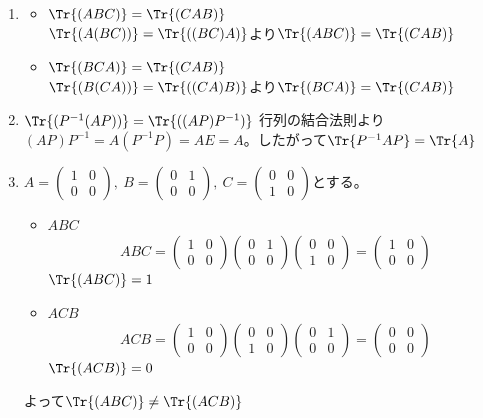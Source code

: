 \begin{souanswer}
\begin{enumerate}
	\item 
\begin{itemize}
	\item $\Tr{(ABC)}= \Tr{(CAB)}$\\
	$\Tr{(A(BC))}= \Tr{((BC)A)}$より$\Tr{(ABC)}= \Tr{(CAB)}$
	\item $\Tr{(BCA)}= \Tr{(CAB)}$\\
	$\Tr{(B(CA))}= \Tr{((CA)B)}$より$\Tr{(BCA)}= \Tr{(CAB)}$
\end{itemize}

	\item $\Tr{(P^{-1}(AP))}= \Tr{((AP)P^{-1})}$
	行列の結合法則より$(AP)P^{-1}= A(P^{-1}P)= AE= A$。したがって$\Tr{P^{-1}AP}= \Tr{A}$

	\item $A= \begin{pmatrix}1& 0\\ 0& 0\end{pmatrix},\ B= \begin{pmatrix}0& 1\\ 0& 0\end{pmatrix},\ C= \begin{pmatrix}0& 0\\ 1& 0\end{pmatrix}$とする。
\begin{itemize}
	\item $ABC$
\begin{equation*}
	ABC= \begin{pmatrix}1& 0\\ 0& 0\end{pmatrix}\begin{pmatrix}0& 1\\ 0& 0\end{pmatrix}\begin{pmatrix}0& 0\\ 1& 0\end{pmatrix}= \begin{pmatrix}1& 0\\ 0& 0\end{pmatrix}
\end{equation*}
	$\Tr{(ABC)}= 1$

	\item $ACB$
\begin{equation*}
	ACB= \begin{pmatrix}1& 0\\ 0& 0\end{pmatrix}\begin{pmatrix}0& 0\\ 1& 0\end{pmatrix}\begin{pmatrix}0& 1\\ 0& 0\end{pmatrix}= \begin{pmatrix}0& 0\\ 0& 0\end{pmatrix}
\end{equation*}
	$\Tr{(ACB)}= 0$
\end{itemize}
	よって$\Tr{(ABC)}\ne \Tr{(ACB)}$
\end{enumerate}
\end{souanswer}